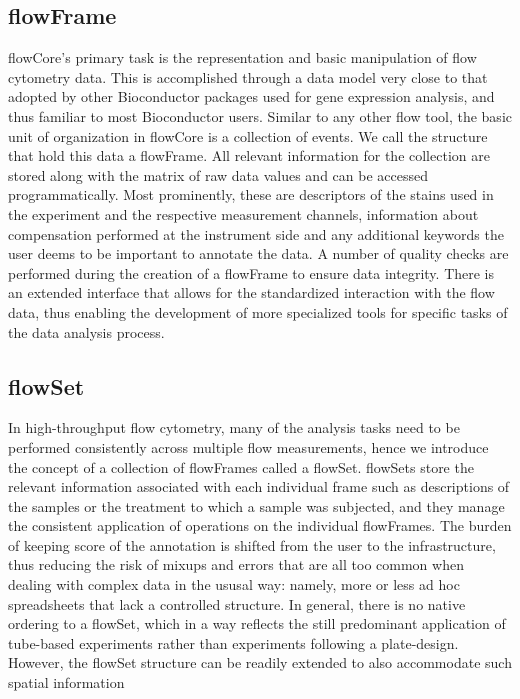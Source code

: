 \documentclass[12pt]{article}
\begin{document}
\subsection*{flowFrame}
flowCore's primary task is the representation and basic manipulation
of flow cytometry data. This is accomplished through a data model very
close to that adopted by other Bioconductor packages used for gene
expression analysis, and thus familiar to most Bioconductor
users. Similar to any other flow tool, the basic unit of organization
in flowCore is a collection of events. We call the structure that hold
this data a flowFrame. All relevant information for the collection are
stored along with the matrix of raw data values and can be accessed
programmatically. Most prominently, these are descriptors of the
stains used in the experiment and the respective measurement channels,
information about compensation performed at the instrument side and
any additional keywords the user deems to be important to annotate the
data. A number of quality checks are performed during the creation of
a flowFrame to ensure data integrity. There is an extended interface
that allows for the standardized interaction with the flow data, thus
enabling the development of more specialized tools for specific tasks
of the data analysis process.

\subsection*{flowSet}
In high-throughput flow cytometry, many of the analysis tasks need to
be performed consistently across multiple flow measurements, hence we
introduce the concept of a collection of flowFrames called a
flowSet. flowSets store the relevant information associated with each
individual frame such as descriptions of the samples or the treatment
to which a sample was subjected, and they manage the consistent
application of operations on the individual flowFrames. The burden of
keeping score of the annotation is shifted from the user to the
infrastructure, thus reducing the risk of mixups and errors that are
all too common when dealing with complex data in the ususal way:
namely, more or less ad hoc spreadsheets that lack a controlled
structure. In general, there is no native ordering to a flowSet, which
in a way reflects the still predominant application of tube-based
experiments rather than experiments following a plate-design. However,
the flowSet structure can be readily extended to also accommodate such
spatial information \citep{(plateCore)}
\end{document}
